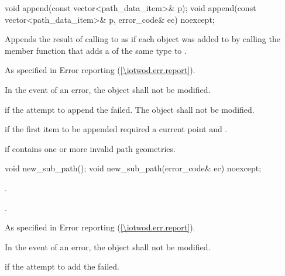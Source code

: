 \begin{itemdecl}
    void append(const vector<path_data_item>& p);
    void append(const vector<path_data_item>& p, error_code& ec) noexcept;
\end{itemdecl}
\begin{itemdescr}
\pnum
\effects
Appends the result of calling  to  as if each  object was added to  by calling the member function that adds a  of the same type to .

\pnum
\throws
As specified in Error reporting (\ref{\iotwod.err.report}).

\pnum
\remarks
In the event of an error, the object shall not be modified.

\pnum
\errors
{} if the attempt to append the  failed. The object shall not be modified.

\pnum
{} if the first item to be appended required a current point and .

\pnum
{} if  contains one or more invalid path geometries.
\end{itemdescr}

\begin{itemdecl}
    void new_sub_path();
    void new_sub_path(error_code& ec) noexcept;
\end{itemdecl}
\begin{itemdescr}
	\pnum
	\effects
	.
	
	\pnum
	.
	
	\pnum
	\throws
	As specified in Error reporting (\ref{\iotwod.err.report}).

	\pnum
	\remarks
	In the event of an error, the object shall not be modified.

	\pnum
	\errors
	 if the attempt to add the  failed.
\end{itemdescr}

